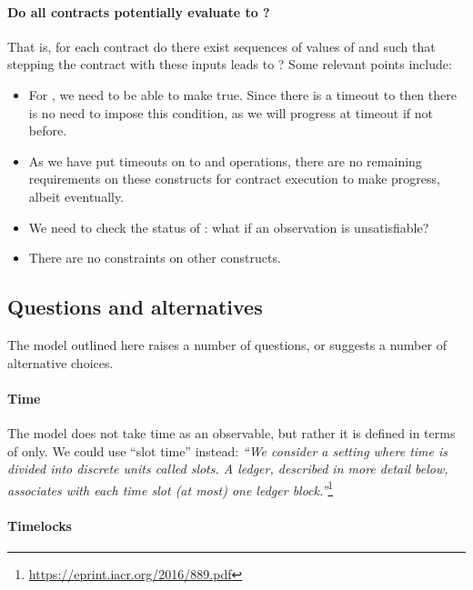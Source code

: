 \documentclass[
      acmsmall
    , screen
    , review=true
  ]{acmart}
\begin{document}
\paragraph{Do all contracts potentially evaluate to ?}

That is, for each contract do there exist sequences of values of  and  such that stepping the contract with these inputs leads to ? Some relevant points include:
\begin{itemize}
\item For , we need to be able to make  true. Since there is 
a timeout to  then there is no need to impose this condition, as we will progress at timeout if not 
before.
\item As we have put timeouts on to  and  operations, there are no remaining requirements on these constructs for contract execution to make progress, albeit eventually.
\item We need to check the status of : what if an observation is unsatisfiable?
\item There are no constraints on other constructs.
\end{itemize}

\subsection{Questions and alternatives}

The model outlined here raises a number of questions, or suggests a number of alternative choices.

\paragraph{Time}

The model does not take time as an observable, but rather it is defined in terms of  only. We could  use ``slot time'' instead: \emph{``We consider a setting where time is divided into discrete units called slots. A ledger, described in more detail below, associates with each time slot (at most) one ledger block.''}\footnote{\url{https://eprint.iacr.org/2016/889.pdf}}

\paragraph{Timelocks}
\end{document}

